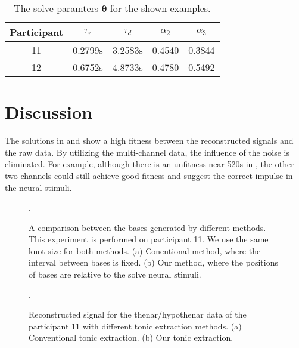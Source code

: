 \documentclass[10pt,conference]{ieeeconf}
\begin{document}
\begin{table}[h] 
  \centering
  \caption{The solve paramters $\boldsymbol{\theta}$ for the shown examples.} \label{tab:theta}
  \begin{tabular}{|c|c|c|c|c|}
    \hline
    Participant & $\tau_r$ & $\tau_d$ & $\alpha_{2}$ & $\alpha_{3}$ \\
    \hline
    11 & 0.2799s & 3.2583s & 0.4540 & 0.3844\\ \hline
    12 & 0.6752s & 4.8733s & 0.4780 & 0.5492\\
    \hline
  \end{tabular}
\end{table}

\section{Discussion}

The solutions in  and  show a high fitness between the reconstructed signals and the raw data. By utilizing the multi-channel data, the influence of the noise is eliminated. For example, although there is an unfitness near 520s in , the other two channels could still achieve good fitness and suggest the correct impulse in the neural stimuli.

\begin{figure}[!tb]
  \centering
  \DeclareGraphicsExtensions.
  \caption{A comparison between the bases generated by different methods. This experiment is performed on participant 11. We use the same knot size for both methods. (a) Conentional method, where the interval between bases is fixed. (b) Our method, where the positions of bases are relative to the solve neural stimuli.} \label{fig:bases}
\end{figure}

\begin{figure}[!tb]
  \centering
  \DeclareGraphicsExtensions.
  \caption{Reconstructed signal for the thenar/hypothenar data of the participant 11 with different tonic extraction methods. (a) Conventional tonic extraction. (b) Our tonic extraction.} \label{fig:comptonic}
\end{figure}
\end{document}
